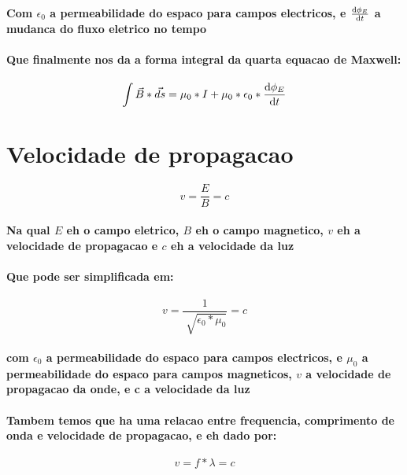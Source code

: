 \documentclass[12pt,twoside, a4paper, twocolumn]{article}
\begin{document}
\paragraph*{Com $\epsilon_0$ a permeabilidade do espaco para campos electricos, e $\frac{\mathrm d \phi_E}{\mathrm d t}$ a mudanca do fluxo eletrico no tempo}
\paragraph*{Que finalmente nos da a forma integral da quarta equacao de Maxwell:}
\begin{equation}
    \int \vec{B} * \vec{ds} = \mu_0 * I + \mu_0 * \epsilon_0 * \frac{\mathrm d \phi_E}{\mathrm d t}
\end{equation}


\section{Velocidade de propagacao}
\begin{equation}
    v = \frac{E}{B} = c
\end{equation}
\paragraph*{Na qual $E$ eh o campo eletrico, $B$ eh o campo magnetico, $v$ eh a velocidade de propagacao e $c$ eh a velocidade da luz}
\paragraph*{Que pode ser simplificada em:}
\begin{equation}
    v = \frac{1}{\sqrt[]{\epsilon_0 * \mu_0}} = c
\end{equation}
\paragraph*{com $\epsilon_0$ a permeabilidade do espaco para campos electricos, e $\mu_0$ a permeabilidade do espaco para campos magneticos, $v$ a velocidade de propagacao da onde, e c a velocidade da luz}

\paragraph*{Tambem temos que ha uma relacao entre frequencia, comprimento de onda e velocidade de propagacao, e eh dado por:}

\begin{equation}
    v = f * \lambda = c
\end{equation}
\end{document}
